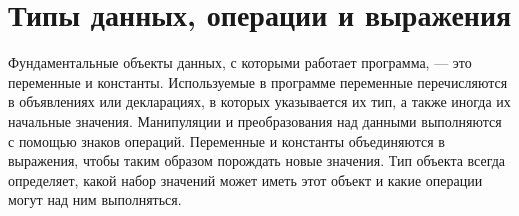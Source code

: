 \chapter{Типы данных, операции и выражения}

Фундаментальные объекты данных, с которыми работает программа, --- это переменные и константы.
Используемые в программе переменные перечисляются в объявлениях или декларациях,
в которых указывается их тип, а также иногда их начальные значения.
Манипуляции и преобразования над данными выполняются с помощью знаков операций.
Переменные и константы объединяются в выражения, чтобы таким образом порождать новые значения.
Тип объекта всегда определяет, какой набор значений может иметь этот объект
и какие операции могут над ним выполняться.




